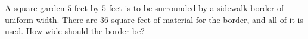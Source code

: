 A square garden $5$ feet by $5$ feet is to be surrounded by a sidewalk border of uniform width. There are $36$ square feet of material for the border, and all of it is used. How wide should the border be?

